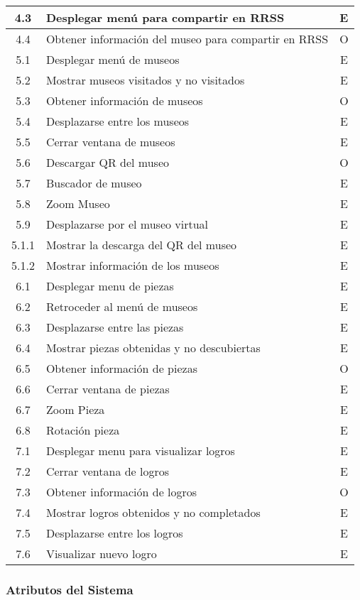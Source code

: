 \begin{longtable}{|c|p{10cm}|c|}
\hline 
4.3 & 
Desplegar menú para compartir en RRSS
 & E \\ 
\hline 
4.4 & Obtener información del museo para compartir en RRSS & O \\ 
\hline 
5.1 & Desplegar menú de museos & E \\ 
\hline 
5.2 & Mostrar museos visitados y no visitados & E \\ 
\hline 
5.3 & Obtener información de museos & O \\ 
\hline 
5.4 & Desplazarse entre los museos & E \\ 
\hline 
5.5 & Cerrar ventana de museos & E \\ 
\hline 
5.6 & Descargar QR del museo & O \\ 
\hline 
5.7 & Buscador de museo & E \\ 
\hline 
5.8 & Zoom Museo & E \\ 
\hline 
5.9 & Desplazarse por el museo virtual & E \\ 
\hline 
5.1.1 & Mostrar la descarga del QR del museo & E \\ 
\hline 
5.1.2 & Mostrar información de los museos & E \\ 
\hline 
6.1 & Desplegar menu de piezas & E \\ 
\hline 
6.2 & Retroceder al menú de museos & E \\ 
\hline 
6.3 & Desplazarse entre las piezas & E \\ 
\hline 
6.4 & Mostrar piezas obtenidas y no descubiertas & E \\ 
\hline 
6.5 & Obtener información de piezas & O \\ 
\hline 
6.6 & Cerrar ventana de piezas & E \\ 
\hline 
6.7 & Zoom Pieza & E \\ 
\hline 
6.8 & Rotación pieza & E \\ 
\hline 
7.1 & Desplegar menu para visualizar logros & E \\ 
\hline 
7.2 & Cerrar ventana de logros & E \\ 
\hline 
7.3 & Obtener información de logros & O \\ 
\hline 
7.4 & Mostrar logros obtenidos y no completados & E \\ 
\hline 
7.5 & Desplazarse entre los logros & E \\ 
\hline 
7.6 & Visualizar nuevo logro & E \\ 
\hline 
\end{longtable} 

\subsubsection{Atributos del Sistema}

